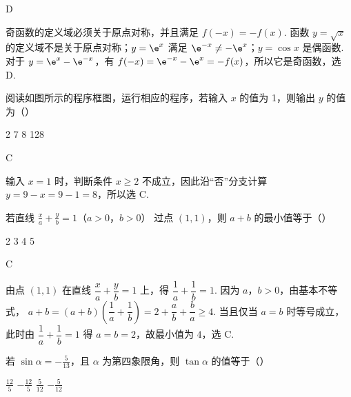\begin{answer}
D
\end{answer}

\begin{solution}
奇函数的定义域必须关于原点对称，并且满足 \(f(-x)=-f(x)\). 函数 \(y=\sqrt{x}\) 的定义域不是关于原点对称；\(y=\e^x\) 满足 \(\e^{-x}\neq-\e^x\)；\(y=\cos x\) 是偶函数. 对于 \(y=\e^x-\e^{-x}\)，有 \(f(-x)=\e^{-x}-\e^x=-f(x)\)，所以它是奇函数，选 D.
\end{solution}

\begin{problem}
阅读如图所示的程序框图，运行相应的程序，若输入 \(x\) 的值为 1，则输出 \(y\) 的值为（\quad）


\choices
    {2}
    {7}
    {8}
    {128}
\end{problem}

\begin{answer}
C
\end{answer}

\begin{solution}
输入 \(x=1\) 时，判断条件 \(x\geqslant2\) 不成立，因此沿“否”分支计算 \(y=9-x=9-1=8\)，所以选 C.
\end{solution}

\begin{problem}
若直线 \(\frac{x}{a} + \frac{y}{b} = 1\)（\(a > 0\)，\(b > 0\)） 过点 \((1,1)\)，则 \(a + b\) 的最小值等于（\quad）

\choices
    {2}
    {3}
    {4}
    {5}
\end{problem}

\begin{answer}
C
\end{answer}

\begin{solution}
由点 \((1,1)\) 在直线 \(\dfrac{x}{a}+\dfrac{y}{b}=1\) 上，得 \(\dfrac1a+\dfrac1b=1\). 因为 \(a\)，\(b>0\)，由基本不等式，
\(a+b=(a+b)\left(\dfrac1a+\dfrac1b\right)=2+\dfrac ab+\dfrac ba\geqslant4\).
当且仅当 \(a=b\) 时等号成立，此时由 \(\dfrac1a+\dfrac1b=1\) 得 \(a=b=2\)，故最小值为 \(4\)，选 C.
\end{solution}

\begin{problem}
若 \(\sin \alpha = -\frac{5}{13}\)，且 \(\alpha\) 为第四象限角，则 \(\tan \alpha\) 的值等于（\quad）

\choices
    {\( \frac{12}{5} \)}
    {\( -\frac{12}{5} \)}
    {\( \frac{5}{12} \)}
    {\(-\frac{5}{12}\)}
\end{problem}

